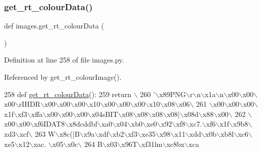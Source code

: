 \subsubsection{\texorpdfstring{get\+\_\+rt\+\_\+colour\+Data()}{get\_rt\_colourData()}}
{\footnotesize\ttfamily def images.\+get\+\_\+rt\+\_\+colour\+Data (\begin{DoxyParamCaption}{ }\end{DoxyParamCaption})}



Definition at line 258 of file images.\+py.



Referenced by get\+\_\+rt\+\_\+colour\+Image().


\begin{DoxyCode}
258 \textcolor{keyword}{def }\hyperlink{namespaceimages_a8a0eb599a4907ce7cf32360e976a092f}{get\_rt\_colourData}():
259     \textcolor{keywordflow}{return} \(\backslash\)
260 \textcolor{stringliteral}{'\(\backslash\)x89PNG\(\backslash\)r\(\backslash\)n\(\backslash\)x1a\(\backslash\)n\(\backslash\)x00\(\backslash\)x00\(\backslash\)x00\(\backslash\)rIHDR\(\backslash\)x00\(\backslash\)x00\(\backslash\)x00\(\backslash\)x10\(\backslash\)x00\(\backslash\)x00\(\backslash\)x00\(\backslash\)x10\(\backslash\)x08\(\backslash\)x06\(\backslash\)}
261 \textcolor{stringliteral}{\(\backslash\)x00\(\backslash\)x00\(\backslash\)x00\(\backslash\)x1f\(\backslash\)xf3\(\backslash\)xffa\(\backslash\)x00\(\backslash\)x00\(\backslash\)x00\(\backslash\)x04sBIT\(\backslash\)x08\(\backslash\)x08\(\backslash\)x08\(\backslash\)x08|\(\backslash\)x08d\(\backslash\)x88\(\backslash\)x00\(\backslash\)}
262 \textcolor{stringliteral}{\(\backslash\)x00\(\backslash\)x00\(\backslash\)xf6IDAT8\(\backslash\)x8dcddbf\(\backslash\)xa0\(\backslash\)x04\(\backslash\)xb0\(\backslash\)xe0\(\backslash\)x92\(\backslash\)xf8\(\backslash\)xc7.\(\backslash\)xf6\(\backslash\)x1f\(\backslash\)x9b8\(\backslash\)xd3\(\backslash\)xcf\(\backslash\)}
263 \textcolor{stringliteral}{W\(\backslash\)x8c(|B\(\backslash\)x9a\(\backslash\)xdf\(\backslash\)xb2\(\backslash\)xf3\(\backslash\)xe35\(\backslash\)x98\(\backslash\)x11\(\backslash\)xdd\(\backslash\)x0b\(\backslash\)xb8l\(\backslash\)xc6\(\backslash\)xe5\(\backslash\)x12\(\backslash\)xac. \(\backslash\)x05\(\backslash\)x0c\(\backslash\)}
264 \textcolor{stringliteral}{B\(\backslash\)x03\(\backslash\)x96T\(\backslash\)xf31lm\(\backslash\)xc8bx\(\backslash\)xca%
}
\end{DoxyCode}
